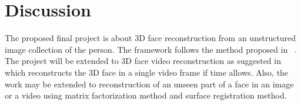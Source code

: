\documentclass[10pt]{article}
\begin{document}
\section*{Discussion}

The proposed final project is about 3D face reconstruction from an unstructured image collection of the person.
The framework follows the method proposed in ~\cite{Kemel2011}. 
The project will be extended to 3D face video reconstruction as suggested in ~\cite{Suwaj2014} which reconstructs the 3D face in a single video frame if time allows. 
Also, the work may be extended to reconstruction of an unseen part of a face in an image or a video using matrix factorization method and surface registration method.




{}

\end{document}
